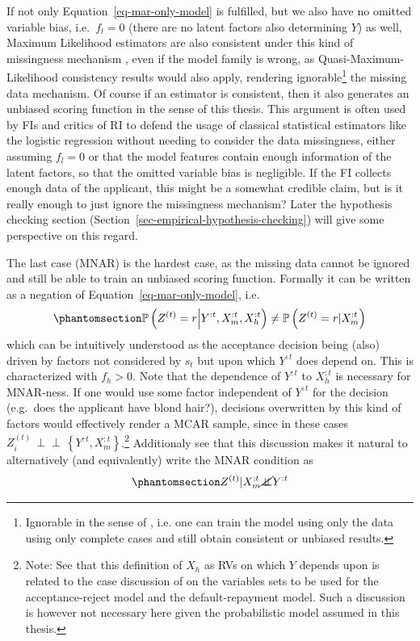 \documentclass[
  12pt,
]{article}
\begin{document}
If not only Equation~\ref{eq-mar-only-model} is fulfilled, but we also
have no omitted variable bias, i.e.~\(f_l=0\) (there are no latent
factors also determining \(Y\)) as well, Maximum Likelihood estimators
are also consistent under this kind of missingness mechanism
\autocite{littleAndRubingAnalysisWithMissingData}, even if the model
family is wrong, as Quasi-Maximum-Likelihood consistency results would
also apply, rendering ignorable\footnote{ Ignorable in the sense of
  \textcite{rubinMissingMechanismsOriginal}, i.e. one can train the
  model using only the data using only complete cases and still obtain
  consistent or unbiased results.} the missing data mechanism. Of course
if an estimator is consistent, then it also generates an unbiased
scoring function in the sense of this thesis. This argument is often
used by FIs and critics of RI to defend the usage of classical
statistical estimators like the logistic regression without needing to
consider the data missingness, either assuming \(f_l=0\) or that the
model features contain enough information of the latent factors, so that
the omitted variable bias is negligible. If the FI collects enough data
of the applicant, this might be a somewhat credible claim, but is it
really enough to just ignore the missingness mechanism? Later the
hypothesis checking section
(Section~\ref{sec-empirical-hypothesis-checking}) will give some
perspective on this regard.

The last case (MNAR) is the hardest case, as the missing data cannot be
ignored and still be able to train an unbiased scoring function.
Formally it can be written as a negation of
Equation~\ref{eq-mar-only-model}, i.e.
\begin{equation}\protect\phantomsection\label{eq-mnar-only-model}{
\mathbb{P}\left(Z^{(t)} = r \middle | Y^{:t}, X_m^{:t}, X_h^{:t} \right) \neq
\mathbb{P}\left(Z^{(t)} = r | X_m^{:t} \right)
}\end{equation} which can be intuitively understood as the acceptance
decision being (also) driven by factors not considered by \(s_t\) but
upon which \(Y^{:t}\) does depend on. This is characterized with
\(f_h > 0\). Note that the dependence of \(Y^{:t}\) to \(X_h^{:t}\) is
necessary for MNAR-ness. If one would use some factor independent of
\(Y^{:t}\) for the decision (e.g.~does the applicant have blond hair?),
decisions overwritten by this kind of factors would effectively render a
MCAR sample, since in these cases
\(Z^{(t)}_i  \, \perp\!\!\!\perp \, \left\{Y^{:t}, X_m^{:t}\right\}\).\footnote{
  Note: See that this definition of \(X_h\) as RVs on which \(Y\)
  depends upon is related to the case discussion of
  \textcite{bansikCrook2007} on the variables sets to be used for the
  acceptance-reject model and the default-repayment model. Such a
  discussion is however not necessary here given the probabilistic model
  assumed in this thesis.} Additionaly see that this discussion makes it
natural to alternatively (and equivalently) write the MNAR condition as
\begin{equation}\protect\phantomsection\label{eq-mnar-as-not-independence}{
Z^{(t)} | X_m^{:t} \cancel{\perp\!\!\!\perp} Y^{:t}
}\end{equation}
\end{document}
